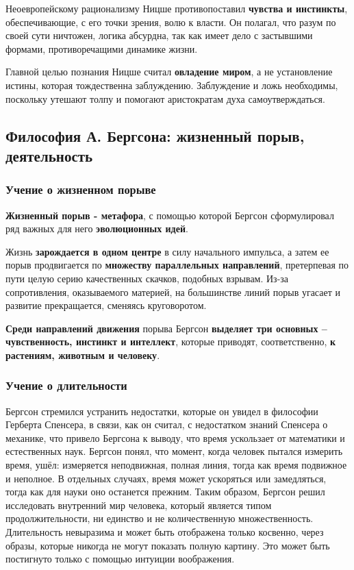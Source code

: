 \documentclass{article}
\begin{document}
\begin{flushleft}
Неоевропейскому рационализму Ницше противопоставил \textbf{чувства и инстинкты}, обеспечивающие, с его точки зрения, волю к власти. Он полагал, что разум по своей сути ничтожен, логика абсурдна, так как имеет дело с застывшими формами, противоречащими динамике жизни.

Главной целью познания Ницше считал \textbf{овладение миром}, а не установление истины, которая тождественна заблуждению. Заблуждение и ложь необходимы, поскольку утешают толпу и помогают аристократам духа самоутверждаться.

\subsection{Философия А. Бергсона: жизненный порыв, деятельность}

\subsubsection{Учение о жизненном порыве}

\textbf{Жизненный порыв - метафора}, с помощью которой Бергсон сформулировал ряд важных для него \textbf{эволюционных идей}.

Жизнь \textbf{зарождается в одном центре} в силу начального импульса, а затем ее порыв продвигается по \textbf{множеству параллельных направлений}, претерпевая по пути целую серию качественных скачков, подобных взрывам. Из-за сопротивления, оказываемого материей, на большинстве линий порыв угасает и развитие прекращается, сменяясь круговоротом. 

\textbf{Среди направлений движения} порыва Бергсон \textbf{выделяет три основных – чувственность, инстинкт и интеллект}, которые приводят, соответственно, \textbf{к растениям, животным и человеку}.

\subsubsection{Учение о длительности}

Бергсон стремился устранить недостатки, которые он увидел в философии Герберта Спенсера, в связи, как он считал, с недостатком знаний Спенсера о механике, что привело Бергсона к выводу, что время ускользает от математики и естественных наук. Бергсон понял, что момент, когда человек пытался измерить время, ушёл: измеряется неподвижная, полная линия, тогда как время подвижное и неполное. В отдельных случаях, время может ускоряться или замедляться, тогда как для науки оно останется прежним. Таким образом, Бергсон решил исследовать внутренний мир человека, который является типом продолжительности, ни единство и не количественную множественность. Длительность невыразима и может быть отображена только косвенно, через образы, которые никогда не могут показать полную картину. Это может быть постигнуто только с помощью интуиции воображения.


\end{flushleft}
\end{document}
